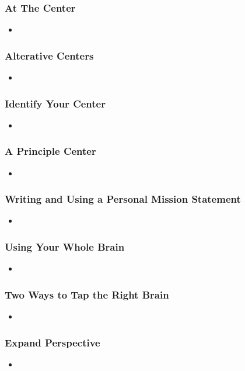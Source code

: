 \documentclass[11pt]{article}
\begin{document}
\subsubsection{At The Center}
\begin{itemize}
\item 
\end{itemize}
\subsubsection{Alterative Centers}
\begin{itemize}
\item 
\end{itemize}
\subsubsection{Identify Your Center}
\begin{itemize}
\item 
\end{itemize}
\subsubsection{A Principle Center}
\begin{itemize}
\item 
\end{itemize}
\subsubsection{Writing and Using a Personal Mission Statement}
\begin{itemize}
\item 
\end{itemize}
\subsubsection{Using Your Whole Brain}
\begin{itemize}
\item 
\end{itemize}
\subsubsection{Two Ways to Tap the Right Brain}
\begin{itemize}
\item 
\end{itemize}
\subsubsection{Expand Perspective}
\begin{itemize}
\item 
\end{itemize}
\end{document}
